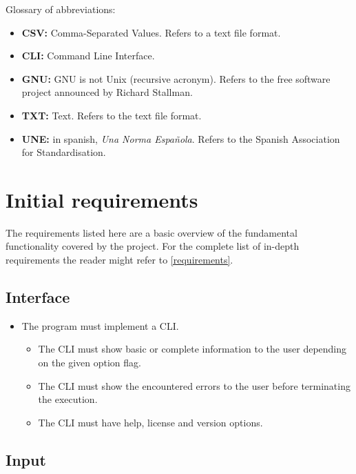 Glossary of abbreviations:

\begin{itemize}
    \item \textbf{CSV:} Comma-Separated Values. Refers to a text file format.
    \item \textbf{CLI:} Command Line Interface.
    \item \textbf{GNU:} GNU is not Unix (recursive acronym). Refers to the free software project announced by Richard Stallman.
    \item \textbf{TXT:} Text. Refers to the text file format.
    \item \textbf{UNE:} in spanish, \textit{Una Norma Española}. Refers to the Spanish Association for Standardisation.
\end{itemize}

\section{Initial requirements}

The requirements listed here are a basic overview of the fundamental functionality covered by the project. For the complete list of in-depth requirements the reader might refer to \ref{requirements}.

\subsection{Interface}

\begin{itemize}
    \item The program must implement a CLI.
        \begin{itemize}
            \item The CLI must show basic or complete information to the user depending on the given option flag.
            \item The CLI must show the encountered errors to the user before terminating the execution.
            \item The CLI must have help, license and version options.
        \end{itemize}
\end{itemize}

\subsection{Input}

